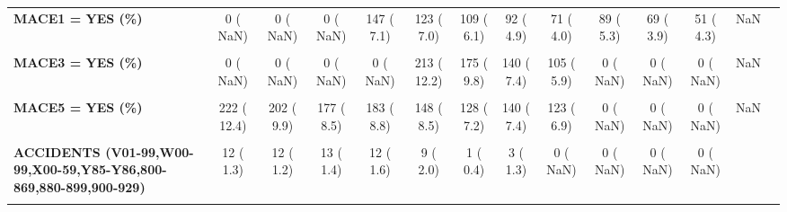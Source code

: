 \documentclass[
]{article}
\begin{document}
\begin{table}[H]
\begin{tabular}[t]{>{\raggedright\arraybackslash}p{5em}ccccccccccccc}
\textbf{MACE1 = YES (\%)} & 0 (  NaN) & 0 (  NaN) & 0 (  NaN) & 147 (  7.1) & 123 (  7.0) & 109 (  6.1) & 92 (  4.9) & 71 (  4.0) & 89 (  5.3) & 69 (  3.9) & 51 (  4.3) & NaN & \\
\textbf{\cellcolor{gray!10}{MACE2 = YES (\%)}} & \cellcolor{gray!10}{0 (  NaN)} & \cellcolor{gray!10}{0 (  NaN)} & \cellcolor{gray!10}{0 (  NaN)} & \cellcolor{gray!10}{0 (  NaN)} & \cellcolor{gray!10}{135 (  7.7)} & \cellcolor{gray!10}{116 (  6.5)} & \cellcolor{gray!10}{106 (  5.6)} & \cellcolor{gray!10}{86 (  4.8)} & \cellcolor{gray!10}{0 (  NaN)} & \cellcolor{gray!10}{0 (  NaN)} & \cellcolor{gray!10}{0 (  NaN)} & \cellcolor{gray!10}{NaN} & \cellcolor{gray!10}{}\\
\textbf{MACE3 = YES (\%)} & 0 (  NaN) & 0 (  NaN) & 0 (  NaN) & 0 (  NaN) & 213 ( 12.2) & 175 (  9.8) & 140 (  7.4) & 105 (  5.9) & 0 (  NaN) & 0 (  NaN) & 0 (  NaN) & NaN & \\
\textbf{\cellcolor{gray!10}{MACE4 = YES (\%)}} & \cellcolor{gray!10}{480 ( 26.8)} & \cellcolor{gray!10}{384 ( 18.8)} & \cellcolor{gray!10}{308 ( 14.7)} & \cellcolor{gray!10}{340 ( 16.4)} & \cellcolor{gray!10}{220 ( 12.6)} & \cellcolor{gray!10}{182 ( 10.2)} & \cellcolor{gray!10}{190 ( 10.1)} & \cellcolor{gray!10}{154 (  8.6)} & \cellcolor{gray!10}{0 (  NaN)} & \cellcolor{gray!10}{0 (  NaN)} & \cellcolor{gray!10}{0 (  NaN)} & \cellcolor{gray!10}{NaN} & \cellcolor{gray!10}{}\\
\textbf{MACE5 = YES (\%)} & 222 ( 12.4) & 202 (  9.9) & 177 (  8.5) & 183 (  8.8) & 148 (  8.5) & 128 (  7.2) & 140 (  7.4) & 123 (  6.9) & 0 (  NaN) & 0 (  NaN) & 0 (  NaN) & NaN & \\
\textbf{\cellcolor{gray!10}{MAIN\_REASON\_GROUP (\%)}} & \cellcolor{gray!10}{} & \cellcolor{gray!10}{} & \cellcolor{gray!10}{} & \cellcolor{gray!10}{} & \cellcolor{gray!10}{} & \cellcolor{gray!10}{} & \cellcolor{gray!10}{} & \cellcolor{gray!10}{} & \cellcolor{gray!10}{} & \cellcolor{gray!10}{} & \cellcolor{gray!10}{} & \cellcolor{gray!10}{NaN} & \cellcolor{gray!10}{}\\
\textbf{ACCIDENTS (V01-99,W00-99,X00-59,Y85-Y86,800-869,880-899,900-929)} & 12 (  1.3) & 12 (  1.2) & 13 (  1.4) & 12 (  1.6) & 9 (  2.0) & 1 (  0.4) & 3 (  1.3) & 0 (  NaN) & 0 (  NaN) & 0 (  NaN) & 0 (  NaN) &  \vphantom{1} & \\
\textbf{\cellcolor{gray!10}{CANCER(C00-C97,140-208,238.6,273.3,289.8)}} & \cellcolor{gray!10}{127 ( 13.9)} & \cellcolor{gray!10}{127 ( 13.1)} & \cellcolor{gray!10}{124 ( 13.8)} & \cellcolor{gray!10}{101 ( 13.7)} & \cellcolor{gray!10}{56 ( 12.2)} & \cellcolor{gray!10}{30 ( 11.0)} & \cellcolor{gray!10}{40 ( 17.8)} & \cellcolor{gray!10}{0 (  NaN)} & \cellcolor{gray!10}{0 (  NaN)} & \cellcolor{gray!10}{0 (  NaN)} & \cellcolor{gray!10}{0 (  NaN)} & \cellcolor{gray!10}{ \vphantom{1}} & \cellcolor{gray!10}{}\\

\end{tabular}
\end{table}
\end{document}
